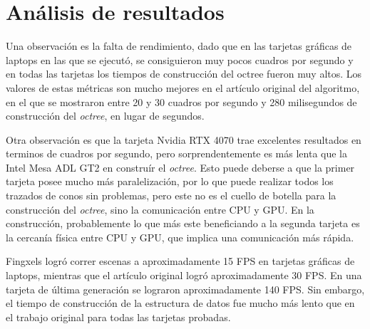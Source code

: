 \section{Análisis de resultados}

Una observación es la falta de rendimiento, dado que en las tarjetas gráficas de laptops en las que se ejecutó, se consiguieron muy pocos cuadros por segundo y en todas las tarjetas los tiempos de construcción del octree fueron muy altos.
Los valores de estas métricas son mucho mejores en el artículo original del algoritmo, en el que se mostraron entre 20 y 30 cuadros por segundo y 280 milisegundos de construcción del \textit{octree}, en lugar de segundos.

Otra observación es que la tarjeta Nvidia RTX 4070 trae excelentes resultados en terminos de cuadros por segundo, pero sorprendentemente es más lenta que la Intel Mesa ADL GT2 en construír el \textit{octree}.
Esto puede deberse a que la primer tarjeta posee mucho más paralelización, por lo que puede realizar todos los trazados de conos sin problemas, pero este no es el cuello de botella para la construcción del \textit{octree}, sino la comunicación entre CPU y GPU.
En la construcción, probablemente lo que más este beneficiando a la segunda tarjeta es la cercanía física entre CPU y GPU, que implica una comunicación más rápida.

Fingxels logró correr escenas a aproximadamente 15 FPS en tarjetas gráficas de laptops, mientras que el artículo original logró aproximadamente 30 FPS.
En una tarjeta de última generación se lograron aproximadamente 140 FPS.
Sin embargo, el tiempo de construcción de la estructura de datos fue mucho más lento que en el trabajo original para todas las tarjetas probadas.

